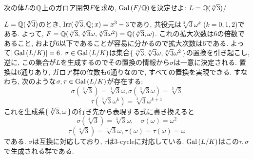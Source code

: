 \begin{egprob}
次の体$L$の$\mathbb{Q}$上のガロア閉包$F$を求め, $\operatorname{Gal}{(F/\mathbb{Q})}$を決定せよ: $L=\mathbb{Q}(\sqrt[3]{3})$/
\end{egprob}
\begin{egans}
$L=\mathbb{Q}(\sqrt[3]{3})$のとき, $\mathrm{Irr}(\sqrt[3]{3},\mathbb{Q};x) = x^3 - 3$であり, 共役元は$\sqrt[3]{3}\omega^{k}$ ($k=0,1,2$)である. よって, $F = \mathbb{Q}(\sqrt[3]{3}, \sqrt[3]{3}\omega, \sqrt[3]{3}\omega^2) = \mathbb{Q}(\sqrt[3]{3},\omega)$. これの拡大次数は6の倍数であること, および6以下であることが容易に分かるので拡大次数は6である. よって$|\operatorname{Gal}{(L/K)}| = 6$.  $\sigma\in \operatorname{Gal}{(L/K)}$は集合$\set{\sqrt[3]{3}, \sqrt[3]{3}\omega, \sqrt[3]{3}\omega^2}$の置換を引き起こし, 逆に, この集合が$L$を生成するのでその置換の情報から$\sigma$は一意に決定される. 置換は6通りあり, ガロア群の位数も6通りなので, すべての置換を実現できる. すなわち, 次のような$\sigma, \tau\in \operatorname{Gal}{(L/K)}$が存在する:
\[\sigma(\sqrt[3]{3}) = \sqrt[3]{3}\omega, \sigma(\sqrt[3]{3}\omega) =\sqrt[3]{3}\]
\[\tau(\sqrt[3]{3}\omega^k) = \sqrt[3]{3}\omega^{k+1}\]
これを生成系$\set{\sqrt[3]{3},\omega}$の行き先から表現する式に書き換えると
\[\sigma(\sqrt[3]{3}) = \sqrt[3]{3}\omega,\quad \sigma(\omega) = \omega^2\]
\[ \tau(\sqrt[3]{3}) = \sqrt[3]{3}\omega , \tau(\omega) = \tau(\omega) = \omega \]
である. $\sigma$は互換に対応しており, $\tau$は3-cycleに対応している. $\operatorname{Gal}{(L/K)}$はこの$\tau,\sigma$で生成される群である.
\end{egans}





\newpage
